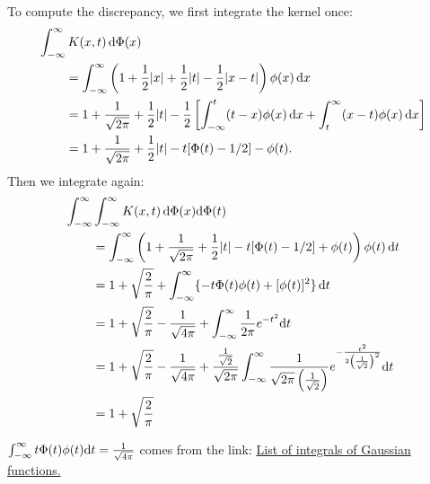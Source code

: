 \documentclass[12pt]{article}
\newcommand{\dif}{{\rm d}}
\begin{document}
\begin{enumerate}
{        To compute the discrepancy, we first integrate the kernel once:
       \begin{align*}
  \MoveEqLeft{\int_{-\infty}^\infty K(x,t) \, \dif \Phi(x)}\\
    & =  \int_{-\infty}^{\infty} \left(1+\frac{1}{2}|x|+\frac{1}{2}|t|-\frac{1}{2}|x-t|\right)\phi(x) \, \dif x\\
    &= 1+ \frac{1}{\sqrt{2\pi}} + \frac{1}{2}|t|-\frac{1}{2}\left[\int_{-\infty}^{t}(t-x)\phi(x) \, \dif x+\int_{t}^{\infty} (x-t)\phi(x) \, \dif x\right]\\
    &= 1+ \frac{1}{\sqrt{2\pi}} + \frac{1}{2}|t| - t [\Phi(t)-1/2] - \phi(t) .
    \end{align*}
    Then we integrate again:
       \begin{align*}
  \MoveEqLeft{\int_{-\infty}^\infty \int_{-\infty}^\infty K(x,t) \, \dif \Phi(x) \dif \Phi(t)}\\
    & =  \int_{-\infty}^{\infty} \left( 1+ \frac{1}{\sqrt{2\pi}} + \frac{1}{2}|t| - t [\Phi(t)-1/2] +  \phi(t) \right)\phi(t) \, \dif t\\
    &= 1+ \sqrt{\frac{2}{\pi}} + \int_{-\infty}^{\infty} \{ - t \Phi(t)\phi(t)  +  [\phi(t)]^2 \} \, \dif t\\
    &= 1+\sqrt{\frac{2}{\pi}}-\frac{1}{\sqrt{4\pi}}+\int_{-\infty}^{\infty}\frac{1}{2\pi}e^{-t^2}\dif t\\
    &= 1+\sqrt{\frac{2}{\pi}}-\frac{1}{\sqrt{4\pi}}+\frac{\frac{1}{\sqrt{2}}}{\sqrt{2\pi}}\int_{-\infty}^{\infty}\frac{1}{\sqrt{2\pi}\left(\frac{1}{\sqrt{2}}\right)}e^{-\frac{t^2}{2\left(\frac{1}{\sqrt{2}}\right)^2}}\dif t\\
    &=1+\sqrt{\frac{2}{\pi}}
    \end{align*}
  
  $\int_{-\infty}^{\infty} t\Phi(t)\phi(t)\dif t = \frac{1}{\sqrt{4\pi}}$ comes from the link: \href{https://en.wikipedia.org/wiki/List_of_integrals_of_Gaussian_functions}{List of integrals of Gaussian functions.}
    }
    

\end{enumerate}
\end{document}

